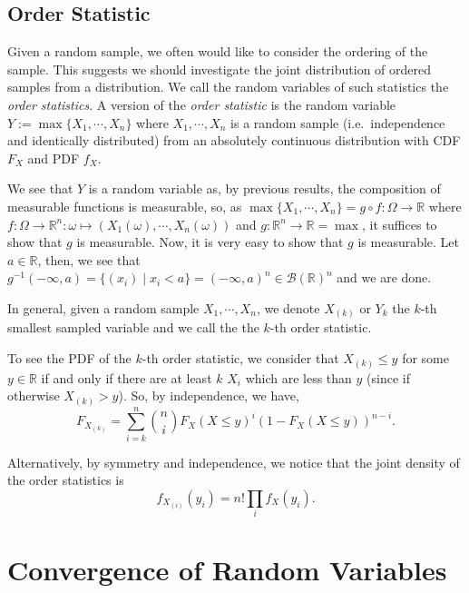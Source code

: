\documentclass[
]{article}
\theoremstyle{definition}
\begin{document}
\hypertarget{order-statistic}{%
\subsection{Order Statistic}\label{order-statistic}}

Given a random sample, we often would like to consider the ordering of
the sample. This suggests we should investigate the joint distribution
of ordered samples from a distribution. We call the random variables of
such statistics the \emph{order statistics}. A version of the
\emph{order statistic} is the random variable
\(Y := \max\{X_1, \cdots, X_n\}\) where \(X_1, \cdots, X_n\) is a random
sample (i.e.~independence and identically distributed) from an
absolutely continuous distribution with CDF \(F_X\) and PDF \(f_X\).

We see that \(Y\) is a random variable as, by previous results, the
composition of measurable functions is measurable, so, as
\(\max\{X_1, \cdots, X_n\} = g \circ f : \Omega \to \mathbb{R}\) where
\(f : \Omega \to \mathbb{R}^n : \omega \mapsto (X_1(\omega), \cdots, X_n(\omega))\)
and \(g : \mathbb{R}^n \to \mathbb{R} = \max\), it suffices to show that
\(g\) is measurable. Now, it is very easy to show that \(g\) is
measurable. Let \(a \in \mathbb{R}\), then, we see that
\(g^{-1}(-\infty, a) = \{(x_i) \mid x_i < a\} = (-\infty, a)^n \in \mathcal{B}(\mathbb{R})^n\)
and we are done.

In general, given a random sample \(X_1, \cdots, X_n\), we denote
\(X_{(k)}\) or \(Y_k\) the \(k\)-th smallest sampled variable and we
call the the \(k\)-th order statistic.

To see the PDF of the \(k\)-th order statistic, we consider that
\(X_{(k)} \le y\) for some \(y \in \mathbb{R}\) if and only if there are
at least \(k\) \(X_i\) which are less than \(y\) (since if otherwise
\(X_{(k)} > y\)). So, by independence, we have,
\[F_{X_{(k)}} = \sum_{i = k}^n \binom{n}{i}F_X(X \le y)^i(1 - F_X(X \le y))^{n - i}.\]

Alternatively, by symmetry and independence, we notice that the joint
density of the order statistics is
\[f_{X_{(i)}}(y_i) = n! \prod_i f_X(y_i).\]

\hypertarget{convergence-of-random-variables}{%
\section{Convergence of Random
Variables}\label{convergence-of-random-variables}}
\end{document}
